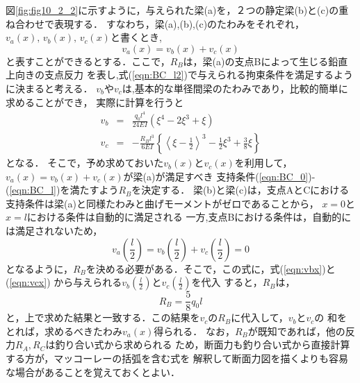 \documentclass[10pt,a4j]{jarticle}
\begin{document}
\begin{enumerate}
図\ref{fig:fig10_2_2}に示すように，与えられた梁(a)を，２つの静定梁(b)と(c)の重ね合わせで表現する．
すなわち，梁(a),(b),(c)のたわみをそれぞれ，$v_a(x),\,v_b(x),\,v_c(x)$と書くとき,
\begin{equation}
	v_a(x)=v_b(x)+v_c(x)
	\label{eqn:v_sum}
\end{equation}
と表すことができるとする．ここで，$R_B$は，梁(a)の支点Bによって生じる鉛直上向きの支点反力
		を表し,式(\ref{eqn:BC_l2})で与えられる拘束条件を満足するように決まると考える．
$v_b$や$v_c$は,基本的な単径間梁のたわみであり，比較的簡単に求めることができ，
実際に計算を行うと
\begin{eqnarray}
	v_b&= & 
		\frac{q_0l^4}{24EI} \left( \xi^4-2\xi^3 +\xi \right)
	\label{eqn:vbx}
	\\
	v_c&= & 
		-\frac{R_Bl^3}{6EI} \left\{ \left< \xi-\frac{1}{2}\right>^3 
		-\frac{1}{2}\xi^3 +\frac{3}{8}\xi \right\}
	\label{eqn:vcx}
\end{eqnarray}
となる．
そこで，予め求めておいた$v_b(x)$と$v_c(x)$を利用して，$v_a(x)=v_b(x)+v_c(x)$が梁(a)が満足すべき
支持条件(\ref{eqn:BC_0})-(\ref{eqn:BC_l})を満たすよう$R_B$を決定する．
梁(b)と梁(c)は，支点AとCにおける支持条件は梁(a)と同様たわみと曲げモーメントがゼロであることから，
$x=0$と$x=l$における条件は自動的に満足される
一方,支点Bにおける条件は，自動的には満足されないため，
\begin{equation}
	v_a\left(\frac{l}{2}\right)
	=
	v_b\left(\frac{l}{2}\right)
	+
	v_c\left(\frac{l}{2}\right)
	=0
	\label{eqn:constraint}
\end{equation}
となるように，$R_B$を決める必要がある．そこで，この式に，式(\ref{eqn:vbx})と(\ref{eqn:vcx})
から与えられる$v_b\left(\frac{l}{2}\right)$と$v_c\left(\frac{l}{2}\right)$を代入
すると，$R_B$は，
\begin{equation}
	R_B=\frac{5}{8}q_0l
\end{equation}
と，上で求めた結果と一致する．この結果を$v_c$の$R_B$に代入して，$v_b$と$v_c$の
和をとれば，求めるべきたわみ$v_a(x)$得られる．
なお，$R_B$が既知であれば，他の反力$R_A,R_C$は釣り合い式から求められる
ため，断面力も釣り合い式から直接計算する方が，マッコーレーの括弧を含む式を
解釈して断面力図を描くよりも容易な場合があることを覚えておくとよい．
\end{enumerate}
\end{document}
